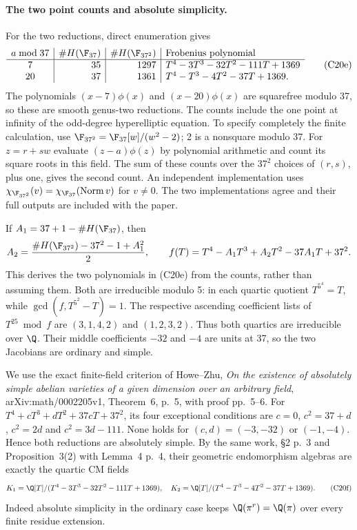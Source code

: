 \paragraph{The two point counts and absolute simplicity.}
For the two reductions, direct enumeration gives
\[
\begin{array}{c|r|r|l}
 a\bmod37 & \#H(\F_{37}) & \#H(\F_{37^2})
                    &\text{Frobenius polynomial}\\ \hline
 7 &35&1297&T^4-3T^3-32T^2-111T+1369\\
 20&37&1361&T^4-T^3-4T^2-37T+1369 .
\end{array}
 \tag{C20e}
\]
The polynomials $(x-7)\phi(x)$ and $(x-20)\phi(x)$ are
squarefree modulo 37, so these are smooth genus-two reductions.
The counts include the one point at infinity of the odd-degree
hyperelliptic equation. To specify completely the finite
calculation, use
$\F_{37^2}=\F_{37}[w]/(w^2-2)$; 2 is a nonsquare modulo 37.
For $z=r+sw$ evaluate $(z-a)\phi(z)$ by polynomial arithmetic
and count its square roots in this field. The sum of these
counts over the $37^2$ choices of $(r,s)$, plus one, gives the
second count. An independent implementation uses
$\chi_{\F_{37^2}}(v)=
\chi_{\F_{37}}(\operatorname{Norm}v)$ for $v\ne0$.
The two implementations agree and their full outputs are
included with the paper.

If $A_1=37+1-\#H(\F_{37})$, then
\[
 A_2=\frac{\#H(\F_{37^2})-37^2-1+A_1^2}{2},
 \qquad
 f(T)=T^4-A_1T^3+A_2T^2-37A_1T+37^2.
\]
This derives the two polynomials in (C20e) from the counts,
rather than assuming them. Both are irreducible modulo 5:
in each quartic quotient $T^{5^4}=T$, while
$\gcd(f,T^{5^2}-T)=1$. The respective ascending coefficient
lists of $T^{25}\bmod f$ are $(3,1,4,2)$ and $(1,2,3,2)$.
Thus both quartics are irreducible over $\Q$.
Their middle coefficients $-32$ and $-4$ are units at 37,
so the two Jacobians are ordinary and simple.

We use the exact finite-field criterion of Howe--Zhu,
\emph{On the existence of absolutely simple abelian varieties
of a given dimension over an arbitrary field},
arXiv:math/0002205v1, Theorem~6, p.~5, with proof pp.~5--6.
For $T^4+cT^3+dT^2+37cT+37^2$, its four exceptional
conditions are
$c=0$, $c^2=37+d$, $c^2=2d$ and $c^2=3d-111$.
None holds for $(c,d)=(-3,-32)$ or $(-1,-4)$.
Hence both reductions are absolutely simple.
By the same work, \S2 p.~3 and Proposition~3(2) with
Lemma~4 p.~4, their geometric endomorphism algebras are
exactly the quartic CM fields
\[
 K_1=\Q[T]/(T^4-3T^3-32T^2-111T+1369),\quad
 K_2=\Q[T]/(T^4-T^3-4T^2-37T+1369).
 \tag{C20f}
\]
Indeed absolute simplicity in the ordinary case keeps
$\Q(\pi^r)=\Q(\pi)$ over every finite residue extension.


